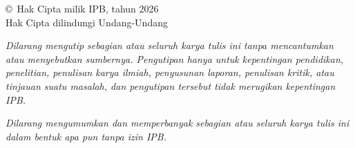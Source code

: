 \clearpage
\thispagestyle{empty}

\vspace*{\fill}

\begin{center}
  \large\copyright\ Hak Cipta milik IPB, tahun 2026\\
   Hak Cipta dilindungi Undang-Undang
\end{center}

\vspace{0cm}

\textit{Dilarang mengutip sebagian atau seluruh karya tulis ini tanpa mencantumkan atau menyebutkan sumbernya. Pengutipan hanya untuk kepentingan pendidikan, penelitian, penulisan karya ilmiah, penyusunan laporan, penulisan kritik, atau tinjauan suatu masalah, dan pengutipan tersebut tidak merugikan kepentingan IPB.}

\textit{Dilarang mengumumkan dan memperbanyak sebagian atau seluruh karya tulis ini dalam bentuk apa pun tanpa izin IPB.}
\vspace{2cm}

